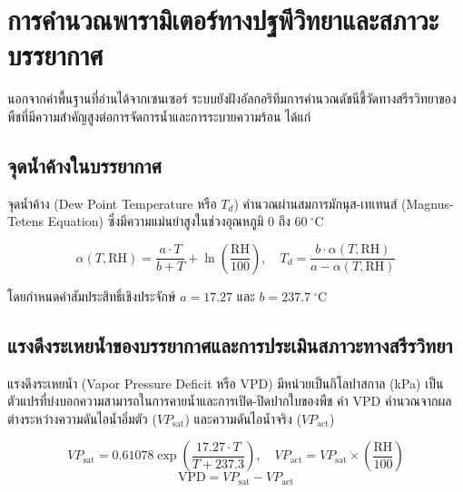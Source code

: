 \section{การคำนวณพารามิเตอร์ทางปฐพีวิทยาและสภาวะบรรยากาศ}

นอกจากค่าพื้นฐานที่อ่านได้จากเซนเซอร์ ระบบยังฝังอัลกอริทึมการคำนวณดัชนีชี้วัดทางสรีรวิทยาของพืชที่มีความสำคัญสูงต่อการจัดการน้ำและการระบายความร้อน ได้แก่

\subsection{จุดน้ำค้างในบรรยากาศ}
จุดน้ำค้าง (Dew Point Temperature หรือ $T_d$) คำนวณผ่านสมการมักนุส-เทเทนส์ (Magnus-Tetens Equation) ซึ่งมีความแม่นยำสูงในช่วงอุณหภูมิ $0$ ถึง $60\ ^\circ\text{C}$

\begin{equation}
    \alpha(T, \text{RH}) = \frac{a \cdot T}{b + T} + \ln\left(\frac{\text{RH}}{100}\right), \quad T_d = \frac{b \cdot \alpha(T, \text{RH})}{a - \alpha(T, \text{RH})}
    \label{eq:dew_point}
\end{equation}

โดยกำหนดค่าสัมประสิทธิ์เชิงประจักษ์ $a = 17.27$ และ $b = 237.7\ ^\circ\text{C}$

\subsection{แรงดึงระเหยน้ำของบรรยากาศและการประเมินสภาวะทางสรีรวิทยา}
แรงดึงระเหยน้ำ (Vapor Pressure Deficit หรือ VPD) มีหน่วยเป็นกิโลปาสกาล (kPa) เป็นตัวแปรที่บ่งบอกความสามารถในการคายน้ำและการเปิด-ปิดปากใบของพืช ค่า VPD คำนวณจากผลต่างระหว่างความดันไอน้ำอิ่มตัว ($VP_{\text{sat}}$) และความดันไอน้ำจริง ($VP_{\text{act}}$)

\begin{equation}
    VP_{\text{sat}} = 0.61078 \exp\left(\frac{17.27 \cdot T}{T + 237.3}\right), \quad VP_{\text{act}} = VP_{\text{sat}} \times \left(\frac{\text{RH}}{100}\right)
    \label{eq:vpd_sat}
\end{equation}
\begin{equation}
    \text{VPD} = VP_{\text{sat}} - VP_{\text{act}}
    \label{eq:vpd}
\end{equation}

